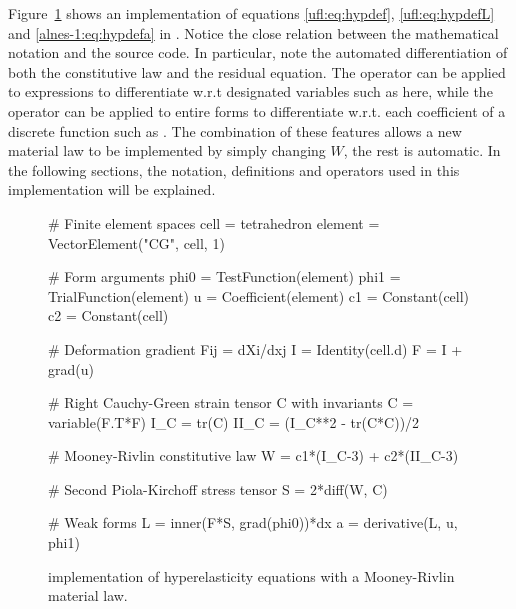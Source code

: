 Figure~\ref{ufl:fig:hypcode} shows an implementation of equations
\eqref{ufl:eq:hypdef}, \eqref{ufl:eq:hypdefL} and \eqref{alnes-1:eq:hypdefa}
in \ufl{}.  Notice the close relation between the mathematical notation
and the \ufl{} source code. In particular, note the automated
differentiation of both the constitutive law and the residual
equation. The operator  can be applied to expressions
to differentiate w.r.t designated variables such as  here,
while the operator  can be applied to entire forms
to differentiate w.r.t. each coefficient of a discrete function such
as .  The combination of these features allows a new material
law to be implemented by simply changing $W$, the rest is automatic.
In the following sections, the notation, definitions and operators used
in this implementation will be explained.

\begin{figure}\label{ufl:fig:hypcode}
\begin{python}
# Finite element spaces
cell = tetrahedron
element = VectorElement("CG", cell, 1)

# Form arguments
phi0 = TestFunction(element)
phi1 = TrialFunction(element)
u = Coefficient(element)
c1 = Constant(cell)
c2 = Constant(cell)

# Deformation gradient Fij = dXi/dxj
I = Identity(cell.d)
F = I + grad(u)

# Right Cauchy-Green strain tensor C with invariants
C = variable(F.T*F)
I_C = tr(C)
II_C = (I_C**2 - tr(C*C))/2

# Mooney-Rivlin constitutive law
W = c1*(I_C-3) + c2*(II_C-3)

# Second Piola-Kirchoff stress tensor
S = 2*diff(W, C)

# Weak forms
L = inner(F*S, grad(phi0))*dx
a = derivative(L, u, phi1)
\end{python}
\caption{\ufl{} implementation of hyperelasticity equations with a
Mooney-Rivlin material law.}
\end{figure}

